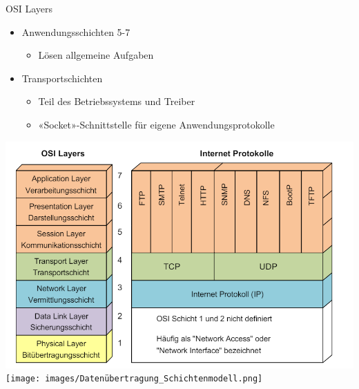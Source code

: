 \begin{definition}{OSI Layers}
    \begin{itemize}
        \item Anwendungsschichten 5-7
        \begin{itemize}
            \item Lösen allgemeine Aufgaben
        \end{itemize}
        \item Transportschichten
        \begin{itemize}
            \item Teil des Betriebssystems und Treiber
            \item «Socket»-Schnittstelle für eigene Anwendungsprotokolle
        \end{itemize}
    \end{itemize}
\end{definition}

\includegraphics[width=0.9\linewidth]{images/OSI_Modell.png}
\texttt{[image: images/Datenübertragung\_Schichtenmodell.png]}




 
    
 
